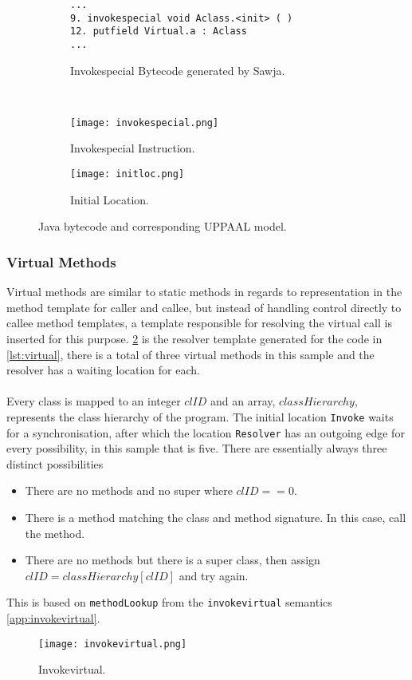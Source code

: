 \begin{figure}
\centering
\begin{subfigure}{\textwidth}
  \begin{lstlisting}
...
9. invokespecial void Aclass.<init> ( )
12. putfield Virtual.a : Aclass
...
  \end{lstlisting}
  \caption{Invokespecial Bytecode generated by Sawja.}
\end{subfigure} \\
\begin{subfigure}{.65\textwidth}
  \texttt{[image: invokespecial.png]}
  \caption{Invokespecial Instruction.}
\end{subfigure}
\hspace{10px}
\begin{subfigure}{.25\textwidth}
  \texttt{[image: initloc.png]}
  \caption{Initial Location.}
\end{subfigure}
\caption{Java bytecode and corresponding UPPAAL model.}
\label{fig:invokespecial}
\end{figure}


\subsubsection{Virtual Methods}
Virtual methods are similar to static methods in regards to representation in the method template for caller and callee, but instead of handling control directly to callee method templates, a template responsible for resolving the virtual call is inserted for this purpose.
\cref{fig:invokevirtual} is the resolver template generated for the code in \cref{lst:virtual}, there is a total of three virtual methods in this sample and the resolver has a waiting location for each.\\\\
Every class is mapped to an integer $clID$ and an array, $classHierarchy$, represents the class hierarchy of the program. The initial location \texttt{Invoke} waits for a synchronisation, after which the location \texttt{Resolver} has an outgoing edge for every possibility, in this sample that is five. There are essentially always three distinct possibilities 

\begin{itemize}
\item There are no methods and no super where $clID == 0$.
\item There is a method matching the class and method signature. In this case, call the method.
\item There are no methods but there is a super class, then assign $clID = classHierarchy[clID]$ and try again.
\end{itemize}

This is based on \texttt{methodLookup} from the \texttt{invokevirtual} semantics \cref{app:invokevirtual}.

 
\begin{figure}[H]
\centering
\texttt{[image: invokevirtual.png]}
\caption{Invokevirtual.}
\label{fig:invokevirtual}
\end{figure}



